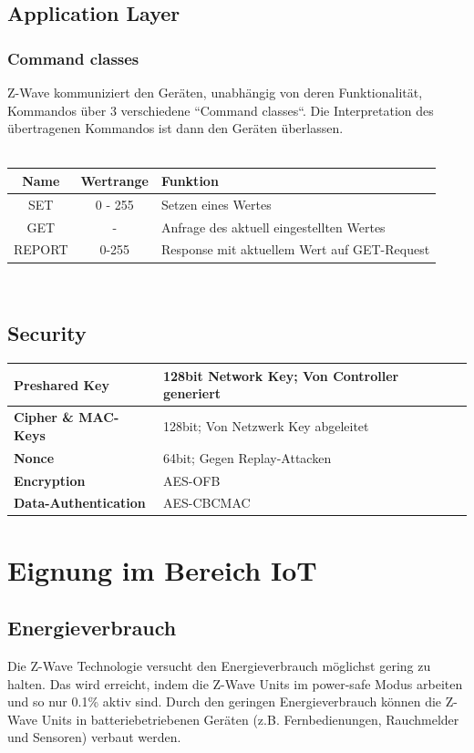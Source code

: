 \documentclass[a4paper,11pt]{article}
\begin{document}
\subsection*{Application Layer}
\subsubsection*{Command classes}
Z-Wave kommuniziert den Geräten, unabhängig von deren Funktionalität, Kommandos über 3 verschiedene ``Command classes``. Die Interpretation des übertragenen Kommandos ist dann den Geräten überlassen.\\\\
\begin{tabular}{| c | c | p{6cm} |}
	\hline
	\textbf{Name} & \textbf{Wertrange}& \textbf{Funktion}\\\hline
	SET & 0 - 255 & Setzen eines Wertes \\\hline
	GET & - & Anfrage des aktuell eingestellten Wertes \\\hline
	REPORT & 0-255 & Response mit aktuellem Wert auf GET-Request\\\hline
\end{tabular}
~
\newpage

\subsection*{Security}
\begin{tabular}{| p{3.5cm} | p{10cm} |}
	\hline
	\textbf{Preshared Key} & 128bit Network Key; Von Controller generiert\\\hline
	\textbf{Cipher \& MAC-Keys} & 128bit; Von Netzwerk Key abgeleitet\\\hline
	\textbf{Nonce} & 64bit; Gegen Replay-Attacken\\\hline
	\textbf{Encryption} & AES-OFB\\\hline
	\textbf{Data-Authentication} & AES-CBCMAC\\\hline
\end{tabular}

\section*{Eignung im Bereich IoT}
\subsection*{Energieverbrauch}
Die Z-Wave Technologie versucht den Energieverbrauch möglichst gering zu halten. Das wird erreicht, indem die Z-Wave Units im power-safe Modus arbeiten und so nur 0.1\% aktiv sind. Durch den geringen Energieverbrauch können die Z-Wave Units in batteriebetriebenen Geräten (z.B. Fernbedienungen, Rauchmelder und Sensoren) verbaut werden.
\end{document}
